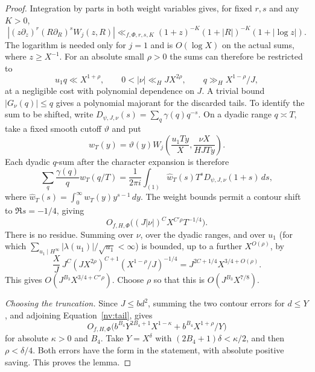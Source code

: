 \begin{proof}
Integration by parts in both weight variables gives, for fixed $r,s$
and any $K>0$,
\[
 |(z\partial_z)^r(R\partial_R)^sW_j(z,R)|
 \ll_{f,\Phi,r,s,K}(1+z)^{-K}(1+|R|)^{-K}(1+|\log z|).
\]
The logarithm is needed only for $j=1$ and is $O(\log X)$ on the
actual sums, where $z\ge X^{-1}$.
For an absolute small $\rho>0$ the sums can therefore be restricted to
\[
 u_1q\ll X^{1+\rho},\qquad
 0<|\nu|\ll_H JX^{2\rho},\qquad
 q\gg_H X^{1-\rho}/J,
\]
at a negligible cost with polynomial dependence on $J$.
A trivial bound $|G_\nu(q)|\le q$ gives a polynomial majorant for the
discarded tails. To identify the sum to be shifted, write
$D_{\psi,J,\nu}(s)=\sum_q\gamma(q)q^{-s}$. On a dyadic range
$q\asymp T$, take a fixed smooth cutoff $\vartheta$ and put
\[
 w_T(y)=\vartheta(y)
 W_j\!\left(\frac{u_1Ty}{X},\frac{\nu X}{HJTy}\right).
\]
Each dyadic $q$-sum after the character expansion is therefore
\[
 \sum_q\frac{\gamma(q)}q w_T(q/T)
 =\frac1{2\pi i}\int_{(1)}
       \widehat w_T(s)T^sD_{\psi,J,\nu}(1+s)\,ds,
\]
where $\widehat w_T(s)=\int_0^\infty w_T(y)y^{s-1}\,dy$.
The weight bounds permit a contour shift to $\Re s=-1/4$, giving
\[
 O_{f,H,\Phi}\bigl((J|\nu|)^C X^{C'\rho}T^{-1/4}\bigr).
\]
There is no residue. Summing over $\nu$, over the dyadic ranges,
and over $u_1$ (for which
$\sum_{u_1\mid H^\infty}|\lambda(u_1)|/\sqrt{u_1}<\infty$)
is bounded, up to a further $X^{O(\rho)}$, by
\[
 \frac XJ\,J^C(JX^{2\rho})^{C+1}
       (X^{1-\rho}/J)^{-1/4}
 =J^{2C+1/4}X^{3/4+O(\rho)}.
\]
This gives $O(J^{B_3}X^{3/4+C''\rho})$. Choose $\rho$ so that this is
$O(J^{B_3}X^{7/8})$.

\par\smallskip\noindent\emph{Choosing the truncation.}
Since $J\le bd^2$, summing the two contour errors for $d\le Y$,
and adjoining Equation~\eqref{nv:tail}, gives
\[
 O_{f,H,\Phi}\bigl(
 b^{B_4}Y^{2B_4+1}X^{1-\kappa}
 +b^{B_4}X^{1+\rho}/Y\bigr)
\]
for absolute $\kappa>0$ and $B_4$.
Take $Y=X^\delta$ with $(2B_4+1)\delta<\kappa/2$, and then
$\rho<\delta/4$. Both errors have the form in the statement,
with absolute positive saving. This proves the lemma.
\end{proof}

